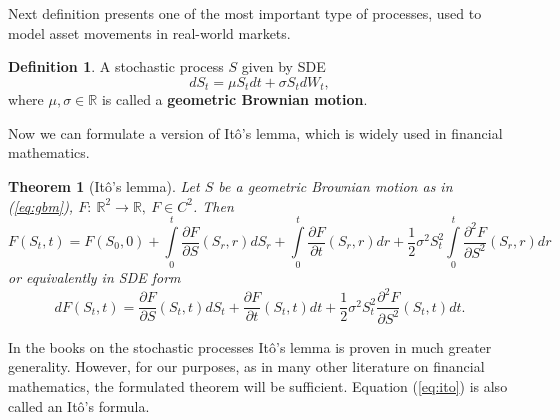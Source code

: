 \documentclass[a4paper,11pt, twoside]{book}
\newtheorem{thm}{Theorem}[chapter]
\theoremstyle{definition}
\newtheorem{mydef}{Definition}[chapter]
\theoremstyle{remark}
\def\R{{\mathbb{R}}}
\begin{document}
Next definition presents one of the most important type of processes, used to model asset movements in real-world markets.
\begin{mydef}
 A stochastic process $S$ given by SDE
 \begin{equation}
  dS_t = \mu S_t dt + \sigma S_t dW_t, 
  \label{eq:gbm}
 \end{equation}
where $\mu,\sigma \in \R$ is called a \textbf{geometric Brownian motion}.
\end{mydef}

Now we can formulate a version of It\^{o}'s lemma, which is widely used in financial mathematics.
\begin{thm}[It\^{o}'s lemma]
 \label{thm:ito}
  Let $S$ be a geometric Brownian motion as in (\ref{eq:gbm}), $F:\ \R^2 \rightarrow \R,\ F \in C^2$. Then 
  \begin{equation*}
   F(S_t, t) = F(S_0, 0) + \int\limits_0^t \frac{\partial F}{\partial S}(S_r,r)dS_r + \int\limits_0^t \frac{\partial F}{\partial t}(S_r,r)dr + \frac{1}{2}\sigma^2 S_t^2 \int\limits_0^t \frac{\partial^2 F}{\partial S^2}(S_r,r)dr
  \end{equation*}
  or equivalently in SDE form
  \begin{equation}
   \label{eq:ito}
   dF(S_t, t) = \frac{\partial F}{\partial S}(S_t,t)dS_t + \frac{\partial F}{\partial t}(S_t,t)dt + \frac{1}{2}\sigma^2 S_t^2 \frac{\partial^2 F}{\partial S^2}(S_t,t)dt   .
  \end{equation}  
\end{thm}

\noindent In the books on the stochastic processes It\^{o}'s lemma is proven in much greater generality. However, for our purposes, as in many other literature on financial mathematics, the formulated theorem will be sufficient.
Equation (\ref{eq:ito}) is also called an It\^{o}'s formula.
\end{document}
